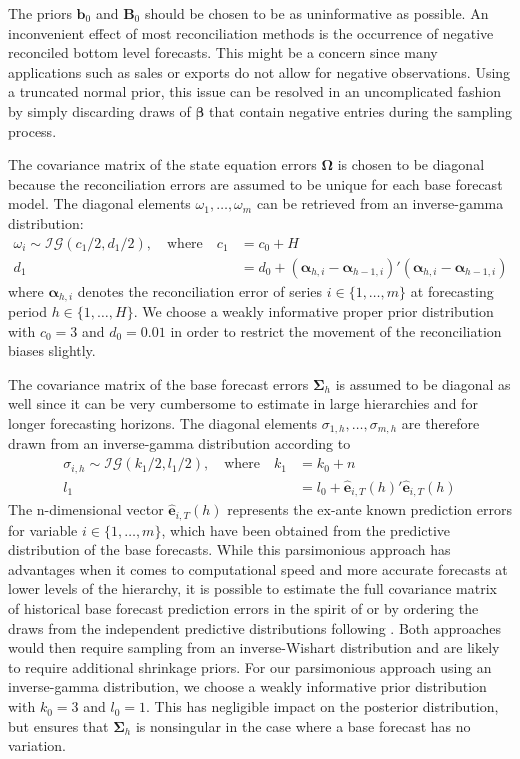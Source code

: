 \documentclass[a4paper,fleqn,11pt]{article}
\begin{document}
The priors $\textbf{b}_0$ and $\textbf{B}_0$ should be chosen to be as uninformative as possible. An inconvenient effect of most reconciliation methods is the occurrence of negative reconciled bottom level forecasts. This might be a concern since many applications such as sales or exports do not allow for negative observations. Using a truncated normal prior, this issue can be resolved in an uncomplicated fashion by simply discarding draws of $\boldsymbol{\beta}$ that contain negative entries during the sampling process.

The covariance matrix of the state equation errors $\boldsymbol{\Omega}$ is chosen to be diagonal because the reconciliation errors are assumed to be unique for each base forecast model. The diagonal elements $\omega_1, \hdots, \omega_m$ can be retrieved from an inverse-gamma distribution:
\begin{align*}
\omega_i \sim \mathcal{IG}(c_1/2,d_1/2), \quad \text{where} \quad c_1 &= c_0 + H\\
	d_1 &= d_0 + (\boldsymbol{\alpha}_{h,i} - \boldsymbol{\alpha}_{h-1,i})'(\boldsymbol{\alpha}_{h,i} - \boldsymbol{\alpha}_{h-1,i})
\end{align*}
where $\boldsymbol{\alpha}_{h,i}$ denotes the reconciliation error of series $i \in \{1, \hdots, m \}$ at forecasting period $h \in \{1, \hdots, H\}$. We choose a weakly informative proper prior distribution with $c_0 = 3$ and $d_0 = 0.01$ in order to restrict the movement of the reconciliation biases slightly. 

The covariance matrix of the base forecast errors $\boldsymbol{\Sigma}_h$ is assumed to be diagonal as well since it can be very cumbersome to estimate in large hierarchies and for longer forecasting horizons. The diagonal elements $\sigma_{1,h}, \hdots, \sigma_{m,h}$ are therefore drawn from an inverse-gamma distribution according to
\begin{align*}
	\sigma_{i,h} \sim \mathcal{IG}(k_1/2,l_1/2), \quad \text{where} \quad k_1 &= k_0 + n\\
	l_1 &= l_0 + \mathbf{\hat{e}}_{i,T}(h)'\mathbf{\hat{e}}_{i,T}(h)
\end{align*}
The n-dimensional vector $\mathbf{\hat{e}}_{i,T}(h)$ represents the ex-ante known prediction errors for variable $i \in \{1, \hdots, m\}$, which have been obtained from the predictive distribution of the base forecasts. While this parsimonious approach has advantages when it comes to computational speed and more accurate forecasts at lower levels of the hierarchy, it is possible to estimate the full covariance matrix of historical base forecast prediction errors in the spirit of \cite{Wickramasuriya2015} or by ordering the draws from the independent predictive distributions following \cite{Jeon2019}. Both approaches would then require sampling from an inverse-Wishart distribution and are likely to require additional shrinkage priors. For our parsimonious approach using an inverse-gamma distribution, we choose a weakly informative prior distribution with $k_0 = 3$ and $l_0 = 1$. This has negligible impact on the posterior
distribution, but ensures that $\boldsymbol{\Sigma}_h$ is nonsingular in the case where a base forecast has no
variation.
\end{document}
